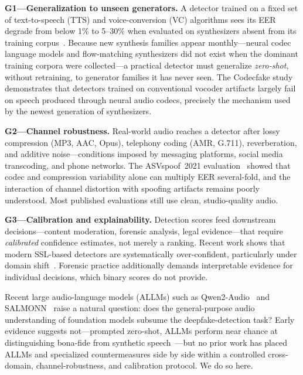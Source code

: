 \textbf{G1---Generalization to unseen generators.} A detector trained on a fixed set of
text-to-speech (TTS) and voice-conversion (VC) algorithms sees its EER degrade from
below 1\% to 5--30\% when evaluated on synthesizers absent from its training
corpus~\cite{muller2022inthewild,muller2024harder}. Because new synthesis families
appear monthly---neural codec language models and flow-matching synthesizers did not
exist when the dominant training corpora were collected---a practical detector must
generalize \emph{zero-shot}, without retraining, to generator families it has never
seen. The Codecfake study~\cite{xie2025codecfake} demonstrates that detectors trained on
conventional vocoder artifacts largely fail on speech produced through neural audio
codecs, precisely the mechanism used by the newest generation of synthesizers.

\textbf{G2---Channel robustness.} Real-world audio reaches a detector after lossy
compression (MP3, AAC, Opus), telephony coding (AMR, G.711), reverberation, and additive
noise---conditions imposed by messaging platforms, social media transcoding, and phone
networks. The ASVspoof~2021 evaluation~\cite{liu2023asvspoof2021} showed that codec and
compression variability alone can multiply EER several-fold, and the interaction of
channel distortion with spoofing artifacts remains poorly understood. Most published
evaluations still use clean, studio-quality audio.

\textbf{G3---Calibration and explainability.} Detection scores feed downstream
decisions---content moderation, forensic analysis, legal evidence---that require
\emph{calibrated} confidence estimates, not merely a ranking. Recent work shows that
modern SSL-based detectors are systematically over-confident, particularly under domain
shift~\cite{pascu2024calibrated}. Forensic practice additionally demands interpretable
evidence for individual decisions, which binary scores do not provide.

Recent large audio-language models (ALLMs) such as Qwen2-Audio~\cite{chu2024qwen2audio}
and SALMONN~\cite{tang2024salmonn} raise a natural question: does the general-purpose
audio understanding of foundation models subsume the deepfake-detection task? Early
evidence suggests not---prompted zero-shot, ALLMs perform near chance at distinguishing
bona-fide from synthetic speech~\cite{gong2025allm4add}---but no prior work has placed
ALLMs and specialized countermeasures side by side within a controlled cross-domain,
channel-robustness, and calibration protocol. We do so here.

